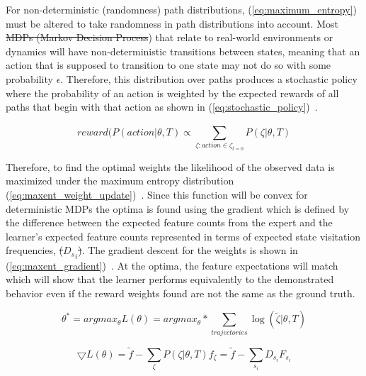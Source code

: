 \documentclass[12pt,american]{report}
\providecommand{\DIFaddtex}[1]{{\protect\color{blue}\uwave{#1}}} %
\providecommand{\DIFdeltex}[1]{{\protect\color{red}\sout{#1}}}                      %
\providecommand{\DIFaddbegin}{} %
\providecommand{\DIFaddend}{} %
\providecommand{\DIFdelbegin}{} %
\providecommand{\DIFdelend}{} %
\providecommand{\DIFadd}[1]{\texorpdfstring{\DIFaddtex{#1}}{#1}} %
\providecommand{\DIFdel}[1]{\texorpdfstring{\DIFdeltex{#1}}{}} %
\newcommand{\DIFscaledelfig}{0.5}
\newlength{\DIFdelgraphicswidth} %
\newlength{\DIFdelgraphicsheight} %
\newcommand{\DIFaddincludegraphics}[2][]{{\color{blue}\fbox{\DIFOincludegraphics[#1]{#2}}}} %
\newcommand{\DIFdelincludegraphics}[2][]{%
\sbox{\DIFdelgraphicsbox}{\DIFOincludegraphics[#1]{#2}}%
\settoboxwidth{\DIFdelgraphicswidth}{\DIFdelgraphicsbox} %
\settoboxtotalheight{\DIFdelgraphicsheight}{\DIFdelgraphicsbox} %
\scalebox{\DIFscaledelfig}{%
\parbox[b]{\DIFdelgraphicswidth}{\usebox{\DIFdelgraphicsbox}\\[-\baselineskip] \rule{\DIFdelgraphicswidth}{0em}}\llap{\resizebox{\DIFdelgraphicswidth}{\DIFdelgraphicsheight}{%
\setlength{\unitlength}{\DIFdelgraphicswidth}%
\begin{picture}(1,1)%
\thicklines\linethickness{2pt} %
{\color[rgb]{1,0,0}\put(0,0){\framebox(1,1){}}}%
{\color[rgb]{1,0,0}\put(0,0){\line( 1,1){1}}}%
{\color[rgb]{1,0,0}\put(0,1){\line(1,-1){1}}}%
\end{picture}%
}\hspace*{3pt}}} %
} %
\DeclareRobustCommand{\DIFaddbegin}{\DIFOaddbegin \let\includegraphics\DIFaddincludegraphics} %
\DeclareRobustCommand{\DIFaddend}{\DIFOaddend \let\includegraphics\DIFOincludegraphics} %
\DeclareRobustCommand{\DIFdelbegin}{\DIFOdelbegin \let\includegraphics\DIFdelincludegraphics} %
\DeclareRobustCommand{\DIFdelend}{\DIFOaddend \let\includegraphics\DIFOincludegraphics} %
\begin{document}
For non-deterministic (randomness) path distributions, (\ref{eq:maximum_entropy}) must be altered to take randomness in path distributions into account. Most \DIFdelbegin \DIFdel{MDPs (Markov Decision Process}\DIFdelend \DIFaddbegin \DIFadd{Markov Decision Processes (MDP}\DIFaddend ) that relate to real-world environments or dynamics will have non-deterministic transitions between states, meaning that an action that is supposed to transition to one state may not do so with some probability $\epsilon$.  Therefore, this distribution over paths produces a stochastic policy where the probability of an action is weighted by the expected rewards of all paths that begin with that action as shown in (\ref{eq:stochastic_policy})~\cite{ziebart2008maximum}.

\begin{equation}
            \label{eq:stochastic_policy}
            reward(P(action | \theta, T) \propto \sum_{\zeta:action\in\zeta_{t=0}}^{}P(\zeta | \theta, T)%
        \end{equation}

Therefore, to find the optimal weights the likelihood of the observed data is maximized under the maximum entropy distribution (\ref{eq:maxent_weight_update})~\cite{ziebart2008maximum}. Since this function will be convex for deterministic MDPs the optima is found using the gradient  which is defined by the difference between the expected feature counts from the expert and the learner's expected feature counts represented in terms of expected state visitation frequencies, \DIFdelbegin \DIFdel{(}\DIFdelend ${{}D_s}_{i}$\DIFdelbegin \DIFdel{)}\DIFdelend .  The gradient descent for the weights is shown in (\ref{eq:maxent_gradient})~\cite{ziebart2008maximum}. At the optima, the feature expectations will match which will show that the learner performs equivalently to the demonstrated behavior even if the reward weights found are not the same as the ground truth.

\begin{equation}
            \label{eq:maxent_weight_update}
            \theta^* = argmax_\theta L(\theta) = argmax_\theta * \sum_{trajectories}^{}\log(\tilde\zeta|\theta,T)%
        \end{equation}

\begin{equation}
            \label{eq:maxent_gradient}
            \bigtriangledown L(\theta) = \tilde f - \sum_{\zeta}^{} P(\zeta|\theta,T)f_\zeta = \tilde f - \sum_{s_i}^{}D_{s_{i}}F_{s_{i}}%
        \end{equation}
\end{document}
